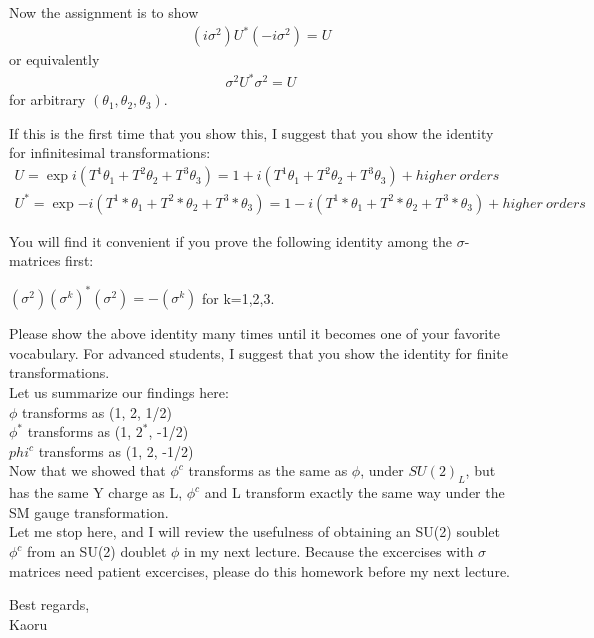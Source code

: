 \documentclass[12pt]{article}
\begin{document}
  Now the assignment is to show
\begin{eqnarray}
  (i\sigma^2) U^* (-i\sigma^2) = U
\end{eqnarray}
or equivalently
\begin{eqnarray}
   \sigma^2 U^* \sigma^2 = U
\end{eqnarray}
  for arbitrary $(\theta_1,\theta_2,\theta_3)$.

  If this is the first time that you show this, I suggest that
  you show the identity for infinitesimal transformations:
  \begin{eqnarray}
  U = \exp{ i(T^1 \theta_1 + T^2 \theta_2 + T^3 \theta_3) }
    = 1 + i(T^1 \theta_1 + T^2 \theta_2 + T^3 \theta_3) + higher~orders\\

  U^* = \exp{ -i (T^1* \theta_1 + T^2* \theta_2 + T^3* \theta_3) }
    = 1 - i(T^1* \theta_1 + T^2* \theta_2 + T^3* \theta_3) + higher~orders
  \end{eqnarray}

  You will find it convenient if you prove the following identity
  among the $\sigma$-matrices first:

  $(\sigma^2) (\sigma^k)^* (\sigma^2) = -(\sigma^k)$  for k=1,2,3.

  Please show the above identity many times until it becomes one
  of your favorite vocabulary.  For advanced students, I suggest
  that you show the identity for finite transformations.\\

  Let us summarize our findings here:\\

   $\phi$   transforms as (1, 2,    1/2)\\
   $\phi^*$ transforms as (1, $2^*$, -1/2)\\
   $phi^c$ transforms as (1, 2,   -1/2)\\

  Now that we showed that $\phi^c$ transforms as the same as $\phi$,
  under $SU(2)_L$, but has the same Y charge as L, $\phi^c$ and L
  transform exactly the same way under the SM gauge transformation.\\

Let me stop here, and I will review the usefulness of obtaining 
an SU(2) soublet $\phi^c$ from an SU(2) doublet $\phi$ in my next 
lecture.  Because the excercises with $\sigma$ matrices need 
patient excercises, please do this homework before my next 
lecture.

Best regards,\\

Kaoru
\end{document}
